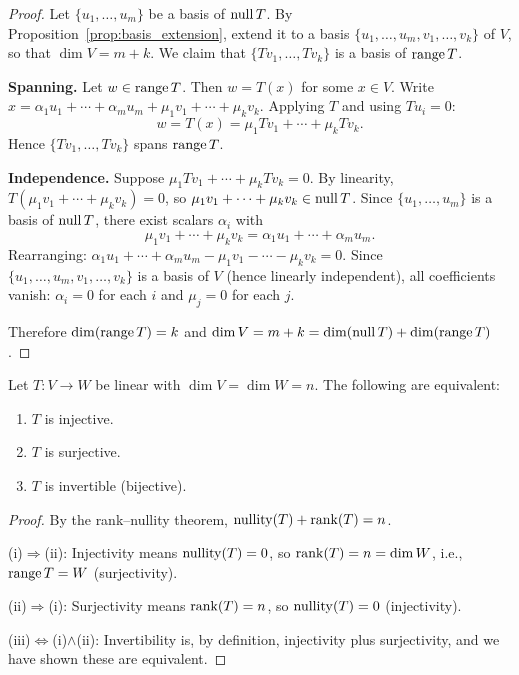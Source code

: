\documentclass[11pt,a4paper]{article}
\begin{document}
\begin{proof}
Let $\{u_1, \ldots, u_m\}$ be a basis of $\operatorname{null} T$.  By
Proposition~\ref{prop:basis_extension}, extend it to a basis
$\{u_1, \ldots, u_m, v_1, \ldots, v_k\}$ of $V$, so that
$\dim V = m + k$.  We claim that $\{Tv_1, \ldots, Tv_k\}$ is a basis
of $\operatorname{range} T$.

\textbf{Spanning.}\;
Let $w \in \operatorname{range} T$.  Then $w = T(x)$ for some $x \in V$.  Write
$x = \alpha_1 u_1 + \cdots + \alpha_m u_m + \mu_1 v_1 + \cdots + \mu_k v_k$.
Applying $T$ and using $Tu_i = 0$:
\[
  w = T(x) = \mu_1 Tv_1 + \cdots + \mu_k Tv_k.
\]
Hence $\{Tv_1, \ldots, Tv_k\}$ spans $\operatorname{range} T$.

\textbf{Independence.}\;
Suppose $\mu_1 Tv_1 + \cdots + \mu_k Tv_k = 0$.  By linearity,
$T(\mu_1 v_1 + \cdots + \mu_k v_k) = 0$, so
$\mu_1 v_1 + \cdots + \mu_k v_k \in \operatorname{null} T$.  Since
$\{u_1, \ldots, u_m\}$ is a basis of $\operatorname{null} T$, there exist scalars
$\alpha_i$ with
\[
  \mu_1 v_1 + \cdots + \mu_k v_k = \alpha_1 u_1 + \cdots + \alpha_m u_m.
\]
Rearranging:
$\alpha_1 u_1 + \cdots + \alpha_m u_m - \mu_1 v_1 - \cdots - \mu_k v_k = 0$.
Since $\{u_1, \ldots, u_m, v_1, \ldots, v_k\}$ is a basis of $V$ (hence
linearly independent), all coefficients vanish: $\alpha_i = 0$ for each $i$
and $\mu_j = 0$ for each $j$.

Therefore $\dim(\operatorname{range} T) = k$ and
$\dim V = m + k = \dim(\operatorname{null} T) + \dim(\operatorname{range} T)$.
\end{proof}

\begin{corollary}
\label{cor:square}
Let $T\colon V \to W$ be linear with $\dim V = \dim W = n$.  The following
are equivalent:
\begin{enumerate}[nosep,label=(\roman*)]
  \item $T$ is injective.
  \item $T$ is surjective.
  \item $T$ is invertible (bijective).
\end{enumerate}
\end{corollary}

\begin{proof}
By the rank--nullity theorem, $\operatorname{nullity}(T) + \operatorname{rank}(T) = n$.

(i)$\Rightarrow$(ii):\; Injectivity means $\operatorname{nullity}(T) = 0$, so
$\operatorname{rank}(T) = n = \dim W$, i.e., $\operatorname{range} T = W$ (surjectivity).

(ii)$\Rightarrow$(i):\; Surjectivity means $\operatorname{rank}(T) = n$, so
$\operatorname{nullity}(T) = 0$ (injectivity).

(iii)$\Leftrightarrow$(i)$\wedge$(ii):\; Invertibility is, by definition,
injectivity plus surjectivity, and we have shown these are equivalent.
\end{proof}
\end{document}
